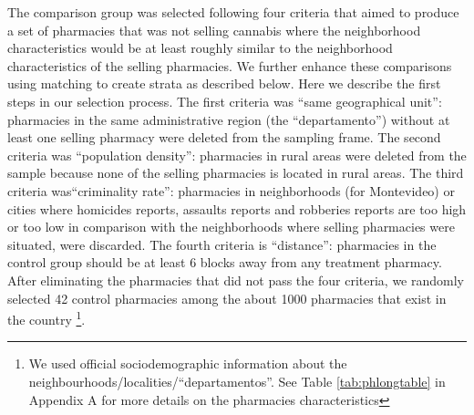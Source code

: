 \documentclass[11pt]{article}
\begin{document}
The comparison group was selected following four criteria that aimed to produce a set of pharmacies that was not selling cannabis where the neighborhood characteristics would be at least roughly similar to the neighborhood characteristics of the selling pharmacies. We further enhance these comparisons using matching to create strata as described below. Here we describe the first steps in our selection process. The first criteria was ``same  geographical unit'':  pharmacies in the same administrative region (the ``departamento'') without at least one selling pharmacy were deleted from the sampling frame. The second criteria was ``population density'':  pharmacies in rural areas were deleted from the sample because none of the selling pharmacies is located in rural areas. The third criteria was``criminality rate'': pharmacies in neighborhoods (for Montevideo) or cities where homicides reports, assaults reports and robberies reports are too high or too low  in comparison with the neighborhoods where selling pharmacies were situated, were discarded. The fourth criteria is ``distance'': pharmacies in the control group should be at least 6 blocks away from any treatment pharmacy. After eliminating the pharmacies that did not pass the four criteria, we randomly selected 42 control pharmacies among the about 1000 pharmacies that exist in the country \footnote{We used official sociodemographic information about the neighbourhoods/localities/``departamentos''. See Table \ref{tab:phlongtable} in Appendix A for more details on the pharmacies characteristics}.
\end{document}
